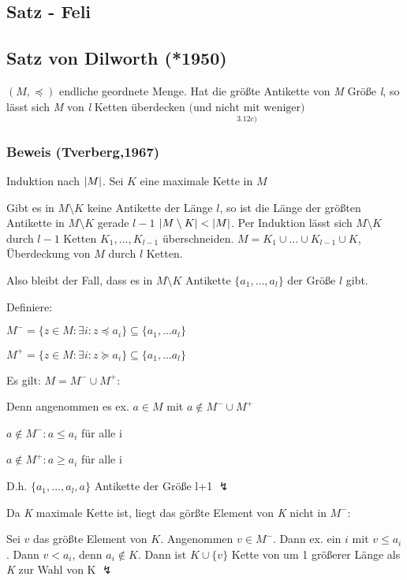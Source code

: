\subsection{Satz - Feli}

\subsection{Satz von Dilworth (*1950)}

$(M, \preceq)$ endliche geordnete Menge. Hat die größte Antikette von \textit{M} Größe \textit{l}, so lässt sich \textit{M} von \textit{l} Ketten überdecken $\underset{3.12 c)}{ \text{(und nicht mit weniger)}}$

\subsubsection*{Beweis (Tverberg,1967)}

Induktion nach $\left|M\right|$. Sei $K$ eine maximale Kette in $M$


Gibt es in $M \setminus K$ keine Antikette der Länge $l$, so ist die Länge der größten Antikette in $M \setminus K$ gerade $l-1$ $\left|M \setminus K\right| < \left|M\right|$. Per Induktion lässt sich $M \setminus K$ durch $l-1$ Ketten $K_1,...,K_{l-1}$ überschneiden. $M = K_1\cup...\cup K_{l-1} \cup K$, Überdeckung von $M$ durch $l$ Ketten.

Also bleibt der Fall, dass es in $M\setminus K$ Antikette $\{a_1,...,a_l\}$ der Größe $l$ gibt.

Definiere:

$M^- = \{ z \in M: \exists i: z \preceq a_i \} \subseteq \{a_1,...a_l\}$

$M^+ = \{ z \in M: \exists i: z \succeq a_i \} \subseteq \{a_1,...a_l\}$

Es gilt: $ M = M^- \cup M^+$:

Denn angenommen es ex. $a\in M$ mit $a \notin M^-\cup M^+$

$a \notin M^-: a\leq a_i$ für alle i

$a \notin M^+: a\geq a_i$ für alle i

D.h. $\{a_1,...,a_l,a\}$ Antikette der Größe l+1 $\lightning$

Da \textit{K} maximale Kette ist, liegt das görßte Element von \textit{K} nicht in $M^-$:

Sei $v$ das größte Element von $K$. Angenommen $v \in M^-$. Dann ex. ein $i$ mit $v \leq a_i$. Dann $v< a_i$, denn $a_i \notin K$. Dann ist $K \cup \{v\}$ Kette von um 1 größerer Länge als \textit{K} zur Wahl von K $\lightning$

